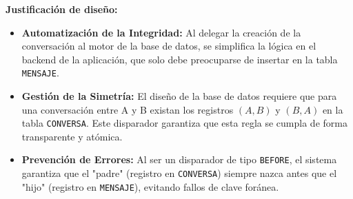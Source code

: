 \textbf{Justificación de diseño:}
\begin{itemize}
    \item \textbf{Automatización de la Integridad:} Al delegar la creación de la conversación al motor de la base de datos, se simplifica la lógica en el backend de la aplicación, que solo debe preocuparse de insertar en la tabla \texttt{MENSAJE}.
    \item \textbf{Gestión de la Simetría:} El diseño de la base de datos requiere que para una conversación entre A y B existan los registros $(A,B)$ y $(B,A)$ en la tabla \texttt{CONVERSA}. Este disparador garantiza que esta regla se cumpla de forma transparente y atómica.
    \item \textbf{Prevención de Errores:} Al ser un disparador de tipo \texttt{BEFORE}, el sistema garantiza que el "padre" (registro en \texttt{CONVERSA}) siempre nazca antes que el "hijo" (registro en \texttt{MENSAJE}), evitando fallos de clave foránea.
\end{itemize}